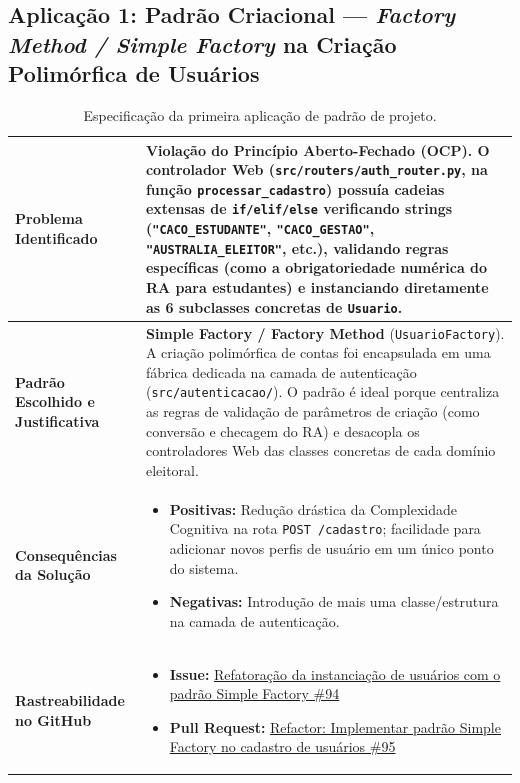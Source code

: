 \documentclass[12pt,a4paper]{article}
\begin{document}
\subsection{Aplicação 1: Padrão Criacional --- \textit{Factory Method / Simple Factory} na Criação Polimórfica de Usuários}

\begin{table}[H]
\centering
\small
\begin{tabularx}{\textwidth}{|l|X|}
\hline
\textbf{Problema Identificado} & 
Violação do Princípio Aberto-Fechado (OCP). O controlador Web (\texttt{src/routers/auth\_router.py}, na função \texttt{processar\_cadastro}) possuía cadeias extensas de \texttt{if/elif/else} verificando strings (\texttt{"CACO\_ESTUDANTE"}, \texttt{"CACO\_GESTAO"}, \texttt{"AUSTRALIA\_ELEITOR"}, etc.), validando regras específicas (como a obrigatoriedade numérica do RA para estudantes) e instanciando diretamente as 6 subclasses concretas de \texttt{Usuario}. \\
\hline
\textbf{Padrão Escolhido e Justificativa} & 
\textbf{Simple Factory / Factory Method} (\texttt{UsuarioFactory}). A criação polimórfica de contas foi encapsulada em uma fábrica dedicada na camada de autenticação (\texttt{src/autenticacao/}). O padrão é ideal porque centraliza as regras de validação de parâmetros de criação (como conversão e checagem do RA) e desacopla os controladores Web das classes concretas de cada domínio eleitoral. \\
\hline
\textbf{Consequências da Solução} & 
\begin{itemize}[leftmargin=1em, nosep]
    \item \textbf{Positivas:} Redução drástica da Complexidade Cognitiva na rota \texttt{POST /cadastro}; facilidade para adicionar novos perfis de usuário em um único ponto do sistema.
    \item \textbf{Negativas:} Introdução de mais uma classe/estrutura na camada de autenticação.
\end{itemize} \\
\hline
\textbf{Rastreabilidade no GitHub} & 
\begin{itemize}[leftmargin=1em, nosep]
    \item \textbf{Issue:} \href{https://github.com/GiizAzul/MC656/issues/94}{Refatoração da instanciação de usuários com o padrão Simple Factory \#94}
    \item \textbf{Pull Request:} \href{https://github.com/GiizAzul/MC656/pull/95}{Refactor: Implementar padrão Simple Factory no cadastro de usuários
\#95}
\end{itemize} \\
\hline
\end{tabularx}
\caption{Especificação da primeira aplicação de padrão de projeto.}
\end{table}
\end{document}
